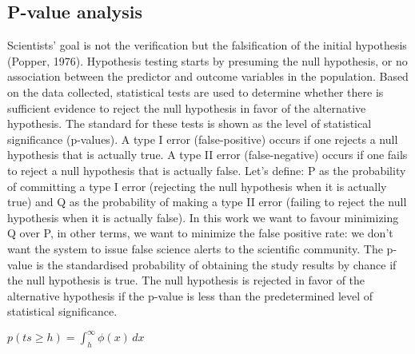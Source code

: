 \subsection{P-value analysis}
Scientists' goal is not the verification but the falsification of the initial hypothesis (Popper, 1976). Hypothesis testing starts by presuming the null hypothesis, or no association between the predictor and outcome variables in the population. Based on the data collected, statistical tests are used to determine whether there is sufficient evidence to reject the null hypothesis in favor of the alternative hypothesis. The standard for these tests is shown as the level of statistical significance (p-values). A type I error (false-positive) occurs if one rejects a null hypothesis that is actually true. A type II error (false-negative) occurs if one fails to reject a null hypothesis that is actually false.
Let's define: P as the probability of committing a type I error (rejecting the null hypothesis when it is actually true) and Q as the probability of making a type II error (failing to reject the null hypothesis when it is actually false).
In this work we want to favour minimizing Q over P, in other terms, we want to minimize the false positive rate: we don't want the system to issue false science alerts to the scientific community.
The p-value is the standardised probability of obtaining the study results by chance if the null hypothesis is true. The null hypothesis is rejected in favor of the alternative hypothesis if the p-value is less than the predetermined level of statistical significance. 

\begin{math}
    p(ts \geq h) = \int_{h}^{\infty} \phi(x) \,dx
\end{math}

